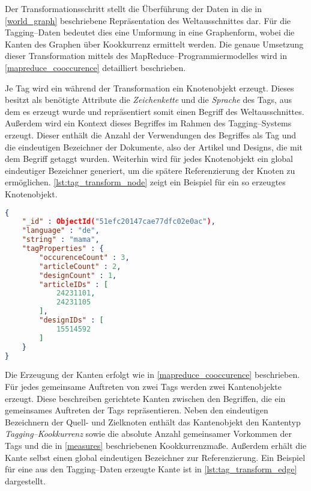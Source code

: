 Der Transformationsschritt stellt die Überführung der Daten in die in \cref{world_graph} beschriebene Repräsentation des Weltausschnittes dar. Für die Tagging--Daten bedeutet dies eine Umformung in eine Graphenform, wobei die Kanten des Graphen über Kookkurrenz ermittelt werden. Die genaue Umsetzung dieser Transformation mittels des MapReduce--Programmiermodelles wird in \cref{mapreduce_cooccurence} detailliert beschrieben.

Je Tag wird ein während der Transformation ein Knotenobjekt erzeugt. Dieses besitzt als benötigte Attribute die \emph{Zeichenkette} und die \emph{Sprache} des Tags, aus dem es erzeugt wurde und repräsentiert somit einen Begriff des Weltausschnittes. Außerdem wird ein Kontext dieses Begriffes im Rahmen des Tagging--Systems erzeugt. Dieser enthält die Anzahl der Verwendungen des Begriffes als Tag und die eindeutigen Bezeichner der Dokumente, also der Artikel und Designs, die mit dem Begriff getaggt wurden. Weiterhin wird für jedes Knotenobjekt ein global eindeutiger Bezeichner generiert, um die spätere Referenzierung der Knoten zu ermöglichen. \cref{lst:tag_transform_node} zeigt ein Beispiel für ein so erzeugtes Knotenobjekt.

\begin{lstlisting}[language=json, label={lst:tag_transform_node}, caption={JSON--Beispiel für einen aus den Tagging--Daten erzeugten Knoten}, float=h]
{
    "_id" : ObjectId("51efc20147cae77dfc02e0ac"),
    "language" : "de",
    "string" : "mama",
    "tagProperties" : {
        "occurenceCount" : 3,
        "articleCount" : 2,
        "designCount" : 1,
        "articleIDs" : [
            24231101,
            24231105
        ],
        "designIDs" : [
            15514592
        ]
    }
}
\end{lstlisting}

Die Erzeugung der Kanten erfolgt wie in \cref{mapreduce_cooccurence} beschrieben. Für jedes gemeinsame Auftreten von zwei Tags werden zwei Kantenobjekte erzeugt. Diese beschreiben gerichtete Kanten zwischen den Begriffen, die ein gemeinsames Auftreten der Tags repräsentieren. Neben den eindeutigen Bezeichnern der Quell- und Zielknoten enthält das Kantenobjekt den Kantentyp \emph{Tagging--Kookkurrenz} sowie die absolute Anzahl gemeinsamer Vorkommen der Tags und die in \cref{measures} beschriebenen Kookkurrenzmaße. Außerdem erhält die Kante selbst einen global eindeutigen Bezeichner zur Referenzierung. Ein Beispiel für eine aus den Tagging--Daten erzeugte Kante ist in \cref{lst:tag_transform_edge} dargestellt.

